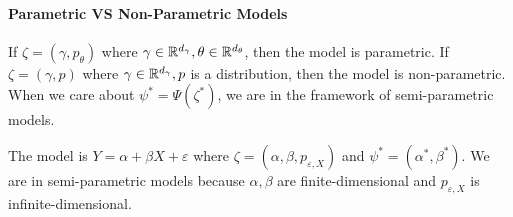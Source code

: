 \paragraph{Parametric VS Non-Parametric Models}
If $\zeta=(\gamma,p_\theta)$ where $\gamma \in \mathbb{R}^{d_\gamma}, \theta \in
    \mathbb{R}^{d_\theta}$, then the model is parametric. If $\zeta=(\gamma,p)$ where
$\gamma \in \mathbb{R}^{d_\gamma}, p$ is a distribution, then the model is
non-parametric. When we care about $\psi^*=\Psi(\zeta^*)$, we are in the
framework of semi-parametric models.
\begin{example}
    The model is $Y=\alpha+\beta X+\varepsilon$ where $\zeta=(\alpha,\beta,p_{\varepsilon,X})$ and $\psi^*=(\alpha^*,\beta^*)$. We are in semi-parametric models because $\alpha,\beta$ are finite-dimensional and $p_{\varepsilon,X}$ is infinite-dimensional.
\end{example}

